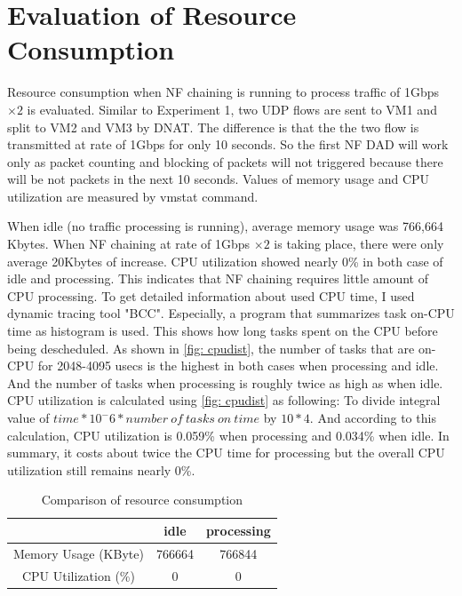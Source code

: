 \section{Evaluation of Resource Consumption}
Resource consumption when NF chaining is running to process traffic of 1Gbps $\times 2 $ is evaluated. Similar to Experiment 1, two UDP flows are sent to VM1 and split to VM2 and VM3 by DNAT. The difference is that the the two flow is transmitted at rate of 1Gbps for only 10 seconds. So the first NF DAD will work only as packet counting and blocking of packets will not triggered because there will be not packets in the next 10 seconds. Values of memory usage and CPU utilization are measured by vmstat command. 

When idle (no traffic processing is running), average memory usage was 766,664 Kbytes. When NF chaining at rate of 1Gbps $\times 2 $ is taking place, there were only average 20Kbytes of increase. CPU utilization showed nearly 0\% in both case of idle and processing. This indicates that NF chaining requires little amount of CPU processing. To get detailed information about used CPU time, I used dynamic tracing tool "BCC". Especially, a program that summarizes task on-CPU time as histogram is used. This shows how long tasks spent on the CPU before being descheduled. As shown in \ref{fig: cpudist}, the number of tasks that are on-CPU for 2048-4095 usecs is the highest in both cases when processing and idle. And the number of tasks when processing is roughly twice as high as when idle. CPU utilization is calculated using \ref{fig: cpudist} as following: To divide integral value of $time*10^-6 * number \: of \: tasks \: on \: time$ by $10*4$. And according to this calculation, CPU utilization is 0.059\% when processing and 0.034\% when idle. In summary, it costs about twice the CPU time for processing but the overall CPU utilization still remains nearly 0\%. 

\begin{table}
	\centering
	\begin{tabular}{|c|c|c|}
	\hline
	 & idle & processing \\
	 \hline
	 Memory Usage (KByte) & 766664 & 766844 \\
	 \hline
	 CPU Utilization (\%) & 0 & 0 \\
	 \hline
	\end{tabular}
	\caption{Comparison of resource consumption}
	\label{tbl: resource}
\end{table}

